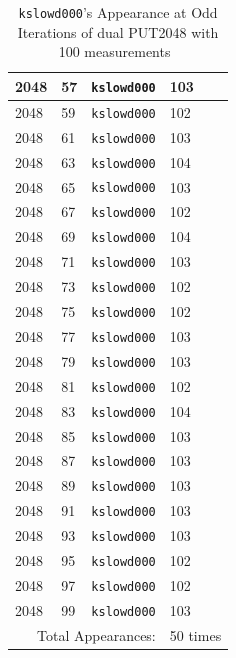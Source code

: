 \documentclass[10pt]{article}
\begin{document}
\begin{table}[htp!]
{\begin{tabular}{|l|l|l|l|}
2048 & 57 & {\tt kslowd000} & 103 \\ \hline
2048 & 59 & {\tt kslowd000} & 102 \\ \hline
2048 & 61 & {\tt kslowd000} & 103 \\ \hline
2048 & 63 & {\tt kslowd000} & 104 \\ \hline
2048 & 65 & {\tt kslowd000} & 103 \\ \hline
2048 & 67 & {\tt kslowd000} & 102 \\ \hline
2048 & 69 & {\tt kslowd000} & 104 \\ \hline
2048 & 71 & {\tt kslowd000} & 103 \\ \hline
2048 & 73 & {\tt kslowd000} & 102 \\ \hline
2048 & 75 & {\tt kslowd000} & 102 \\ \hline
2048 & 77 & {\tt kslowd000} & 103 \\ \hline
2048 & 79 & {\tt kslowd000} & 103 \\ \hline
2048 & 81 & {\tt kslowd000} & 102 \\ \hline
2048 & 83 & {\tt kslowd000} & 104 \\ \hline
2048 & 85 & {\tt kslowd000} & 103 \\ \hline
2048 & 87 & {\tt kslowd000} & 103 \\ \hline
2048 & 89 & {\tt kslowd000} & 103 \\ \hline
2048 & 91 & {\tt kslowd000} & 103 \\ \hline
2048 & 93 & {\tt kslowd000} & 103 \\ \hline
2048 & 95 & {\tt kslowd000} & 102 \\ \hline
2048 & 97 & {\tt kslowd000} & 102 \\ \hline
2048 & 99 & {\tt kslowd000} & 103 \\ \hline
\multicolumn{3}{|r|}{Total Appearances:} & 50 times\\ \hline
  \end{tabular}
  }
 \caption{{\tt kslowd000}'s Appearance at Odd Iterations of dual PUT2048 with 100 measurements~\label{fig:rc_dual_put_2048_odd}}
\end{table}
\end{document}
